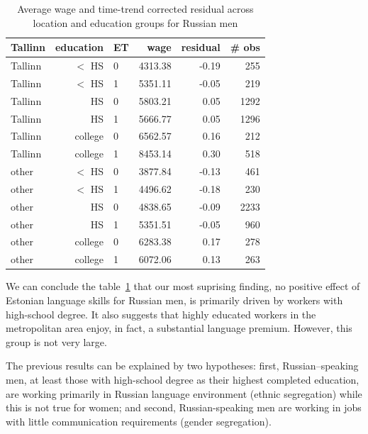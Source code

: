 \documentclass[12pt, a4paper]{article}
\begin{document}
\begin{table}[ht]
  \centering
  \caption{Average wage and time-trend corrected residual across
    location and education groups for Russian men}
  \begin{tabular}{lrlrrr}
    \toprule
    Tallinn & education & ET & wage & residual & \# obs \\ 
    \midrule
    Tallinn & $<$ HS & 0 & 4313.38 & -0.19 & 255 \\ 
    Tallinn & $<$ HS & 1 & 5351.11 & -0.05 & 219 \\ 
    Tallinn & HS     & 0 & 5803.21 & 0.05 & 1292 \\ 
    Tallinn & HS      & 1 & 5666.77 & 0.05 & 1296 \\ 
    Tallinn & college & 0 & 6562.57 & 0.16 & 212 \\ 
    Tallinn & college & 1 & 8453.14 & 0.30 & 518 \\ 
    other   & $<$ HS & 0 & 3877.84 & -0.13 & 461 \\ 
    other   & $<$ HS & 1 & 4496.62 & -0.18 & 230 \\ 
    other   & HS     & 0 & 4838.65 & -0.09 & 2233 \\ 
    other   & HS      & 1 & 5351.51 & -0.05 & 960 \\ 
    other   & college & 0 & 6283.38 & 0.17 & 278 \\ 
    other   & college & 1 & 6072.06 & 0.13 & 263 \\ 
    \bottomrule
  \end{tabular}
  \label{tab:loc-lang-edu}
\end{table}

We can conclude the table~\ref{tab:loc-lang-edu} that our
most suprising finding, no positive effect of Estonian language
skills for Russian men, is primarily driven by workers with
high-school degree.  It also suggests that highly educated workers in
the metropolitan area enjoy, in fact, a substantial language premium.
However, this group is not very large.

The previous results can be explained by two hypotheses: first,
Russian--speaking men, at least those with high-school degree as their
highest completed education, are working
primarily in Russian language environment (ethnic segregation) while this is not true for
women; and second, Russian-speaking men are working in jobs with
little communication requirements (gender segregation).
\end{document}
